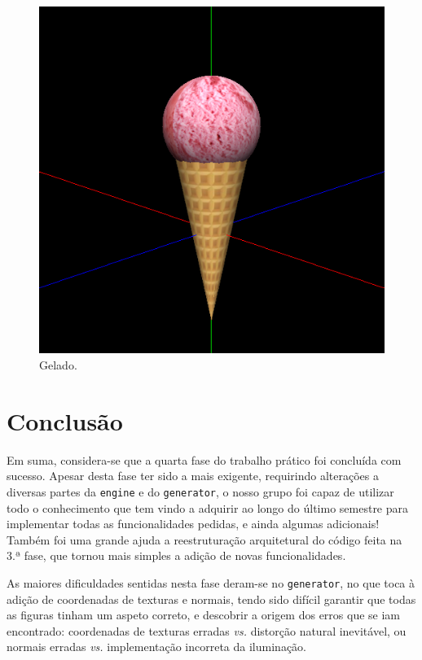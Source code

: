 \documentclass[12pt, a4paper]{article}
\begin{document}
\begin{figure}[H]
    \centering
    \includegraphics[width=\textwidth]{res/phase4/IceCreamXYZ.png}
    \caption{Gelado.}
\end{figure}

\section{Conclusão}

Em suma, considera-se que a quarta fase do trabalho prático foi concluída com sucesso. Apesar desta
fase ter sido a mais exigente, requirindo alterações a diversas partes da \texttt{engine} e do
\texttt{generator}, o nosso grupo foi capaz de utilizar todo o conhecimento que tem vindo a adquirir
ao longo do último semestre para implementar todas as funcionalidades pedidas, e ainda algumas
adicionais! Também foi uma grande ajuda a reestruturação arquitetural do código feita na 3.ª fase,
que tornou mais simples a adição de novas funcionalidades.

As maiores dificuldades sentidas nesta fase deram-se no \texttt{generator}, no que toca à adição de
coordenadas de texturas e normais, tendo sido difícil garantir que todas as figuras tinham um aspeto
correto, e descobrir a origem dos erros que se iam encontrado: coordenadas de texturas erradas
\emph{vs.} distorção natural inevitável, ou normais erradas \emph{vs.} implementação incorreta da
iluminação.
\end{document}
